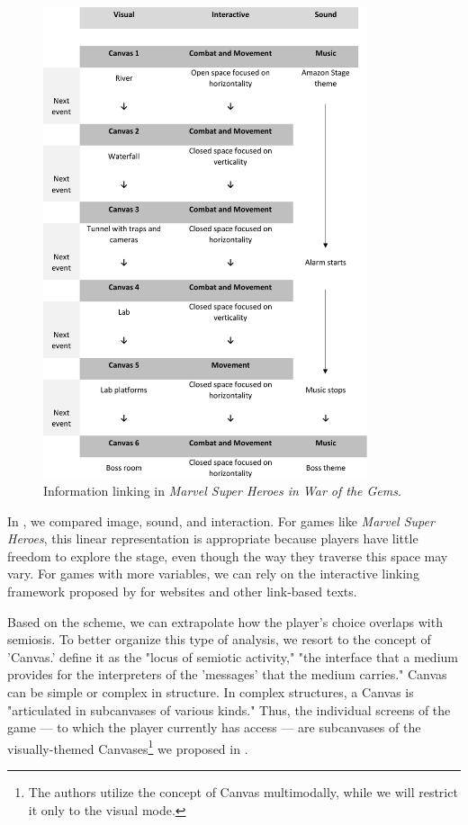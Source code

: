 \documentclass[english]{textolivre}
\begin{document}
\begin{figure}[htbp]
 \centering
 \includegraphics[width=0.85\textwidth]{fig-3.pdf}
 \caption{Information linking in \textit{Marvel Super Heroes in War of the Gems}.}
 \label{fig04}
\end{figure}

In , we compared image, sound, and interaction. For games like \textit{Marvel Super Heroes}, this linear representation is appropriate because players have little freedom to explore the stage, even though the way they traverse this space may vary. For games with more variables, we can rely on the interactive linking framework proposed by \textcite[p. 237]{van_leeuwen_introducing_2005} for websites and other link-based texts.

Based on the scheme, we can extrapolate how the player's choice overlaps with semiosis. To better organize this type of analysis, we resort to the concept of 'Canvas.' \textcite[p. 101]{bateman_multimodality:_2017} define it as the "locus of semiotic activity," "the interface that a medium provides for the interpreters of the 'messages' that the medium carries." Canvas can be simple or complex in structure. In complex structures, a Canvas is "articulated in subcanvases of various kinds." Thus, the individual screens of the game — to which the player currently has access — are subcanvases of the visually-themed Canvases\footnote{The authors utilize the concept of Canvas multimodally, while we will restrict it only to the visual mode.} we proposed in .
\end{document}
